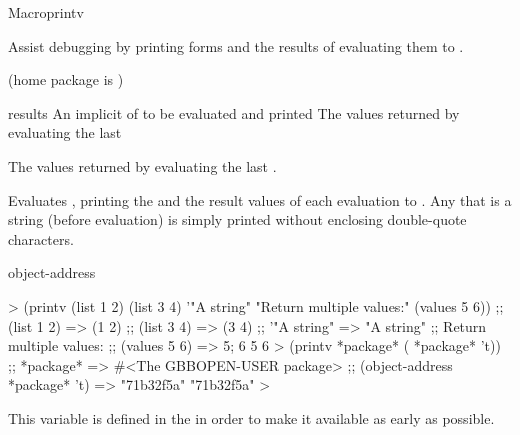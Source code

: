 \documentclass[10pt,twoside,english,pdftex]{article}
\begin{document}

\begin{functiondoc}{Macro}{printv}{\superstar{} 
    \returns{} \superstar}
% 

\fnsyntax

\fnpurpose Assist debugging by printing forms and the results of
evaluating them to .

\fnpackage {} (home package is
)

\fnmodule {}

\fnargs
\begin{args}{results}
\arg[forms] An implicit  of  to be
evaluated and printed  
\arg[results] The values returned by evaluating the last 
\end{args}

\fnreturns The values returned by evaluating the last .

\fndescription Evaluates , printing the  and the
result values of each evaluation to .  Any
 that is a string (before evaluation) is simply printed without
enclosing double-quote characters.

\begin{alsos}{object-address}
\end{alsos}

%
\fnexamples
%
\W\supp
\begin{example}
  > (printv (list 1 2) (list 3 4) '"A string" 
            "Return multiple values:" (values 5 6))
  ;;  (list 1 2) => (1 2)
  ;;  (list 3 4) => (3 4)
  ;;  '"A string" => "A string"
  ;; Return multiple values:
  ;;  (values 5 6) => 5; 6
  5
  6\goodpagebreak
  > (printv *package* ( *package* 't))
  ;;  *package* => #<The GBBOPEN-USER package>
  ;;  (object-address *package* 't) => "71b32f5a"
  "71b32f5a"
  >
\end{example}

\fnnote
{}%
%
%
This variable is defined in the  
in order to make it available as early as possible.

\end{functiondoc}
\end{document}
